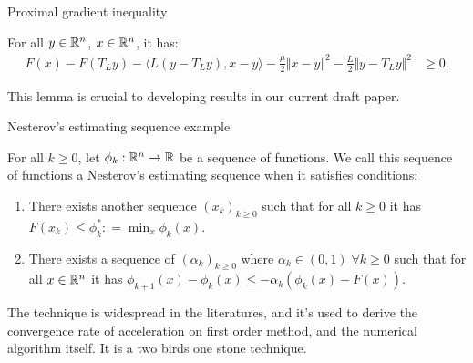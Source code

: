 \documentclass[11pt]{beamer}
\theoremstyle{definition}
\begin{document}
        \begin{frame}{Proximal gradient inequality}
            \begin{lemma}\label{thm:prox-grad-ineq}
                For all $y \in \mathbb R^n$, $x \in \mathbb R^n$, it has: 
                {\scriptsize
                \begin{align*}
                    F(x)  - F(T_Ly) - \langle L(y - T_Ly), x - y\rangle
                    - \frac{\mu}{2}\Vert x - y\Vert^2 - \frac{L}{2}\Vert y - T_Ly\Vert^2 
                    &\ge 0. 
                \end{align*}
                }
            \end{lemma}
            This lemma is crucial to developing results in our current draft paper. 
        \end{frame}
        \begin{frame}{Nesterov's estimating sequence example}
            \begin{definition}\label{def:nes-est-seq}
                For all $k \ge 0$, let $\phi_k : \mathbb R^n \rightarrow\mathbb R$ be a sequence of functions. 
                We call this sequence of functions a Nesterov's estimating sequence when it satisfies conditions: 
                \begin{enumerate}
                    \item There exists another sequence $(x_k)_{k \ge 0}$ such that for all $k \ge 0$ it has $F(x_k) \le \phi_k^*: =\min_{x}\phi_k(x)$. 
                    \item There exists a sequence of $(\alpha_k)_{k \ge 0}$ where $\alpha_k \in (0, 1)\; \forall k \ge0 $ such that for all $x \in \mathbb R^n$ it has $\phi_{k + 1}(x) - \phi_k(x) \le - \alpha_k(\phi_k(x) - F(x))$. 
                \end{enumerate}
            \end{definition}
            The technique is widespread in the literatures, and it's used to derive the convergence rate of acceleration on first order method, and the numerical algorithm itself. It is a two birds one stone technique. 
        \end{frame}
\end{document}
